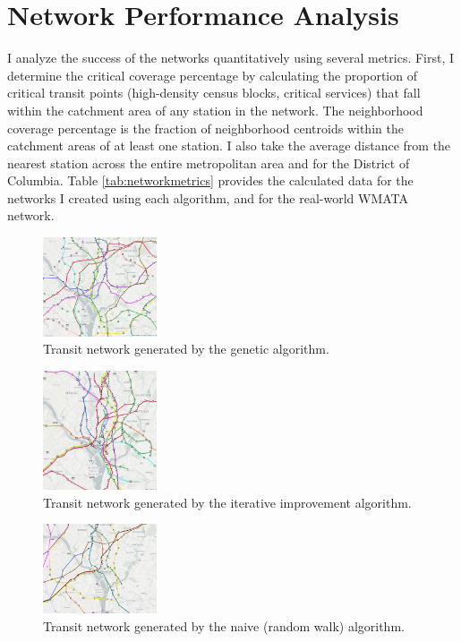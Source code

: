 \documentclass[sigconf,nonacm]{acmart}
\begin{document}
\section{Network Performance Analysis}

I analyze the success of the networks quantitatively using several metrics. First, I determine the critical coverage percentage by calculating the proportion of critical transit points (high-density census blocks, critical services) that fall within the catchment area of any station in the network. The neighborhood coverage percentage is the fraction of neighborhood centroids within the catchment areas of at least one station. I also take the average distance from the nearest station across the entire metropolitan area and for the District of Columbia. Table \ref{tab:networkmetrics} provides the calculated data for the networks I created using each algorithm, and for the real-world WMATA network.

\begin{figure}[h]
    \centering
    \includegraphics[width=0.3\textwidth]{./img/gen.png}
    \caption{Transit network generated by the genetic algorithm.}
    \label{fig:genetic_network}
\end{figure}

\begin{figure}[h]
    \centering
    \includegraphics[width=0.3\textwidth]{./img/iter.png}
    \caption{Transit network generated by the iterative improvement algorithm.}
    \label{fig:iterative_network}
\end{figure}

\begin{figure}[h]
    \centering
    \includegraphics[width=0.3\textwidth]{./img/naive.png}
    \caption{Transit network generated by the naive (random walk) algorithm.}
    \label{fig:naive_network}
\end{figure}
\end{document}
